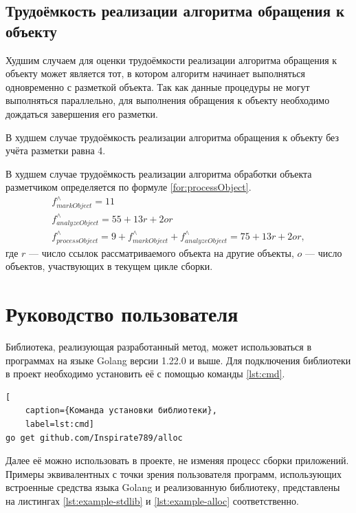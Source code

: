 \subsection{Трудоёмкость реализации алгоритма обращения к объекту}

Худшим случаем для оценки трудоёмкости реализации алгоритма обращения к объекту может является тот, в котором алгоритм начинает выполняться одновременно с разметкой объекта. Так как данные процедуры не могут выполняться параллельно, для выполнения обращения к объекту необходимо дождаться завершения его разметки.

В худшем случае трудоёмкость реализации алгоритма обращения к объекту без учёта разметки равна 4.

В худшем случае трудоёмкость реализации алгоритма обработки объекта разметчиком определяется по формуле \ref{for:processObject}.
\begin{equation}
	\label{for:processObject}
	\begin{array}{l}
	f_{markObject}^{\wedge} = 11\\
	f_{analyzeObject}^{\wedge} = 55 + 13r + 2or\\
	f_{processObject}^{\wedge} = 9 + f_{markObject}^{\wedge} + f_{analyzeObject}^{\wedge} = 75 + 13r + 2or,
	\end{array}
\end{equation}
где $r$ --- число ссылок рассматриваемого объекта на другие объекты, $o$ --- число объектов, участвующих в текущем цикле сборки.



\section{Руководство пользователя}

Библиотека, реализующая разработанный метод, может использоваться в программах на языке Golang версии 1.22.0 и выше. Для подключения библиотеки в проект необходимо установить её с помощью команды \ref{lst:cmd}.

\begin{lstlisting}[
	caption={Команда установки библиотеки},
	label=lst:cmd]
go get github.com/Inspirate789/alloc
\end{lstlisting}

Далее её можно использовать в проекте, не изменяя процесс сборки приложений. Примеры эквивалентных с точки зрения пользователя программ, использующих встроенные средства языка Golang и реализованную библиотеку, представлены на листингах \ref{lst:example-stdlib} и \ref{lst:example-alloc} соответственно.

